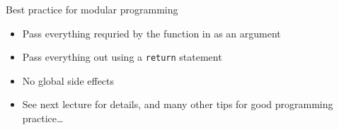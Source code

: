 \documentclass[ignorenonframetext,]{beamer}
\providecommand{\tightlist}{%
  \setlength{\itemsep}{0pt}\setlength{\parskip}{0pt}}
\begin{document}
\begin{frame}[fragile]{Best practice for modular programming}

\begin{itemize}[<+->]
\tightlist
\item
  Pass everything requried by the function in as an argument
\item
  Pass everything out using a \texttt{return} statement
\item
  No global side effects
\item
  See next lecture for details, and many other tips for good programming
  practice\ldots{}
\end{itemize}

\end{frame}
\end{document}
